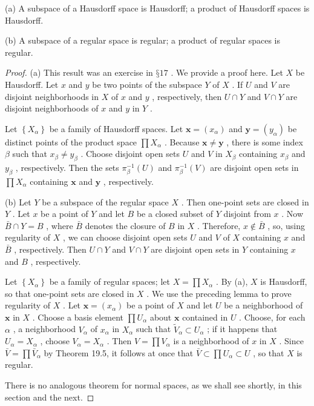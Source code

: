 \begin{theorem}
	(a) A subspace of a Hausdorff space is Hausdorff; a product of Hausdorff spaces is Hausdorff.

(b) A subspace of a regular space is regular; a product of regular spaces is regular.
\end{theorem}
\begin{proof}
	(a) This result was an exercise in \(§{17}\) . We provide a proof here. Let \(X\) be Hausdorff. Let \(x\) and \(y\) be two points of the subspace \(Y\) of \(X\) . If \(U\) and \(V\) are disjoint neighborhoods in \(X\) of \(x\) and \(y\) , respectively, then \(U \cap  Y\) and \(V \cap  Y\) are disjoint neighborhoods of \(x\) and \(y\) in \(Y\) .

Let \(\left\{  {X}_{\alpha }\right\}\) be a family of Hausdorff spaces. Let \(\mathbf{x} = \left( {x}_{\alpha }\right)\) and \(\mathbf{y} = \left( {y}_{\alpha }\right)\) be distinct points of the product space \(\prod {X}_{\alpha }\) . Because \(\mathbf{x} \neq  \mathbf{y}\) , there is some index \(\beta\) such that \({x}_{\beta } \neq  {y}_{\beta }\) . Choose disjoint open sets \(U\) and \(V\) in \({X}_{\beta }\) containing \({x}_{\beta }\) and \({y}_{\beta }\) , respectively. Then the sets \({\pi }_{\beta }^{-1}\left( U\right)\) and \({\pi }_{\beta }^{-1}\left( V\right)\) are disjoint open sets in \(\prod {X}_{\alpha }\) containing \(\mathbf{x}\) and \(\mathbf{y}\) , respectively.

(b) Let \(Y\) be a subspace of the regular space \(X\) . Then one-point sets are closed in \(Y\) . Let \(x\) be a point of \(Y\) and let \(B\) be a closed subset of \(Y\) disjoint from \(x\) . Now \(\bar{B} \cap  Y = B\) , where \(\bar{B}\) denotes the closure of \(B\) in \(X\) . Therefore, \(x \notin  \bar{B}\) , so, using regularity of \(X\) , we can choose disjoint open sets \(U\) and \(V\) of \(X\) containing \(x\) and \(\bar{B}\) , respectively. Then \(U \cap  Y\) and \(V \cap  Y\) are disjoint open sets in \(Y\) containing \(x\) and \(B\) , respectively.

Let \(\left\{  {X}_{\alpha }\right\}\) be a family of regular spaces; let \(X = \prod {X}_{\alpha }\) . By (a), \(X\) is Hausdorff, so that one-point sets are closed in \(X\) . We use the preceding lemma to prove regularity of \(X\) . Let \(\mathbf{x} = \left( {x}_{\alpha }\right)\) be a point of \(X\) and let \(U\) be a neighborhood of \(\mathbf{x}\) in \(X\) . Choose a basis element \(\prod {U}_{\alpha }\) about \(\mathbf{x}\) contained in \(U\) . Choose, for each \(\alpha\) , a neighborhood \({V}_{\alpha }\) of \({x}_{\alpha }\) in \({X}_{\alpha }\) such that \({\widetilde{V}}_{\alpha } \subset  {U}_{\alpha }\) ; if it happens that \({U}_{\alpha } = {X}_{\alpha }\) , choose \({V}_{\alpha } = {X}_{\alpha }\) . Then \(V = \prod {V}_{\alpha }\) is a neighborhood of \(x\) in \(X\) . Since \(\bar{V} = \prod {\bar{V}}_{\alpha }\) by Theorem 19.5, it follows at once that \(\bar{V} \subset  \prod {U}_{\alpha } \subset  U\) , so that \(X\) is regular.

There is no analogous theorem for normal spaces, as we shall see shortly, in this section and the next.
\end{proof}

